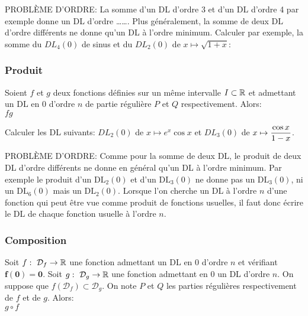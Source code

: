 \documentclass[a4paper, 11pt]{article}
\begin{document}
{\noindent \warning  PROBL\`{E}ME D'ORDRE: La somme d'un DL d'ordre 3 et d'un DL d'ordre 4 par exemple donne un DL d'ordre \ldots\ldots. Plus g\'en\'eralement, la somme de deux DL d'ordre diff\'erents ne donne qu'un DL \`{a} l'ordre minimum.
Calculer par exemple, la somme du $DL_4(0)$ de sinus et du $DL_2(0)$ de $x\mapsto \sqrt{1+x}$:




\subsubsection{Produit}
 {\noindent  

\begin{prop} 
Soient $f$ et $g$ deux fonctions d\'efinies sur un m\^eme intervalle $I\subset \mathbb{R}$ et admettant un DL en 0 d'ordre $n$ de partie r\'eguli\`ere $P$ et $Q$ respectivement. Alors:\\
\noindent  $fg$ \dotfill\vsec\\
\phantom{ } \dotfill\vsec
\end{prop}
 
}

{\footnotesize \begin{exercice} Calculer les DL suivants: $DL_2(0)$ de $x\mapsto e^x\cos{x}$ et $DL_3(0)$ de $x\mapsto \displaystyle\frac{\cos{x}}{1-x}$.
\end{exercice}
}

\noindent \warning  PROBL\`{E}ME D'ORDRE: Comme pour la somme de deux DL, le produit de deux DL d'ordre diff\'erents ne donne en g\'en\'eral qu'un DL \`a l'ordre minimum. Par exemple le produit d'un $\mathrm{DL}_2(0)$ et d'un $\mathrm{DL}_3(0)$ ne donne pas un $\mathrm{DL}_3(0)$, ni un $\mathrm{DL}_6(0)$ mais un $\mathrm{DL}_2(0)$.
Lorsque l'on cherche un DL \`a l'ordre $n$ d'une fonction qui peut \^etre vue comme produit de fonctions usuelles, il faut donc \'ecrire le DL de chaque fonction usuelle \`a l'ordre $n$.\vsec\vsec



\subsubsection{Composition}
 {\noindent  

\begin{prop} 
Soit $f:\ \mathcal{D}_f\rightarrow \mathbb{R}$ une fonction admettant un DL en 0 d'ordre $n$ et v\'erifiant $\mathbf{f(0)=0}$. Soit $g:\ \mathcal{D}_g\rightarrow \mathbb{R}$ une fonction admettant en 0 un DL d'ordre $n$. On suppose que $f\left( \mathcal{D}_f\right)\subset\mathcal{D}_g$. On note $P$ et $Q$ les parties r\'eguli\`eres respectivement de $f$ et de $g$. Alors:\\
\noindent $g\circ f$ \dotfill\vsec\\
\phantom{ } \dotfill\vsec
\end{prop}
 
}}
\end{document}
